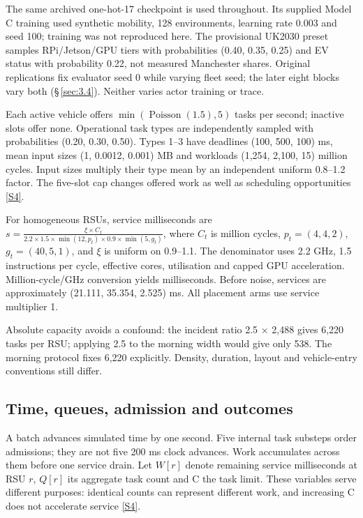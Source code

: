 \documentclass[11pt,a4paper]{article}
\begin{document}
The same archived one-hot-17 checkpoint is used throughout. Its supplied Model C training used synthetic mobility, 128 environments, learning rate 0.003 and seed 100; training was not reproduced here. The provisional UK2030 preset samples RPi/Jetson/GPU tiers with probabilities (0.40, 0.35, 0.25) and EV status with probability 0.22, not measured Manchester shares. Original replications fix evaluator seed 0 while varying fleet seed; the later eight blocks vary both (\S\,\ref{sec:3.4}). Neither varies actor training or trace.

Each active vehicle offers $\min(\operatorname{Poisson}(1.5),5)$ tasks per second; inactive slots offer none. Operational task types are independently sampled with probabilities (0.20, 0.30, 0.50). Types 1--3 have deadlines (100, 500, 100) ms, mean input sizes (1, 0.0012, 0.001) MB and workloads (1,254, 2,100, 15) million cycles. Input sizes multiply their type mean by an independent uniform 0.8--1.2 factor. The five-slot cap changes offered work as well as scheduling opportunities \hyperref[source-s4]{[S4]}.

For homogeneous RSUs, service milliseconds are $s = \frac{\xi \times C_t}{2.2 \times 1.5 \times \min(12,p_t) \times 0.9 \times \min(5,g_t)}$, where $C_t$ is million cycles, $p_t=(4,4,2)$, $g_t=(40,5,1)$, and \ensuremath{\xi} is uniform on 0.9--1.1. The denominator uses 2.2 GHz, 1.5 instructions per cycle, effective cores, utilisation and capped GPU acceleration. Million-cycle/GHz conversion yields milliseconds. Before noise, services are approximately (21.111, 35.354, 2.525) ms. All placement arms use service multiplier 1.

Absolute capacity avoids a confound: the incident ratio 2.5 \ensuremath{\times} 2,488 gives 6,220 tasks per RSU; applying 2.5 to the morning width would give only 538. The morning protocol fixes 6,220 explicitly. Density, duration, layout and vehicle-entry conventions still differ.

\subsection{Time, queues, admission and outcomes}\label{sec:2.4}

A batch advances simulated time by one second. Five internal task substeps order admissions; they are not five 200 ms clock advances. Work accumulates across them before one service drain. Let $W[r]$ denote remaining service milliseconds at RSU $r$, $Q[r]$ its aggregate task count and C the task limit. These variables serve different purposes: identical counts can represent different work, and increasing C does not accelerate service \hyperref[source-s4]{[S4]}.
\end{document}
